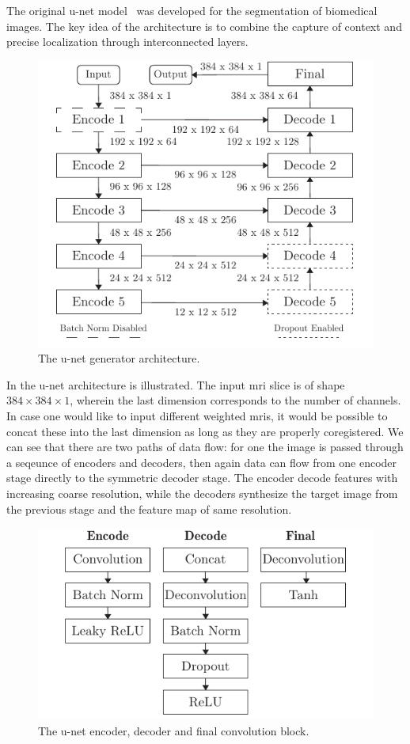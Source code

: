 The original u-net model~\cite{Ronneberger15} was developed for the
segmentation of biomedical images. The key idea of the architecture is to
combine the capture of context and precise localization through interconnected
layers.
\begin{figure}[h]
  \centering
  \includegraphics[width=\linewidth]{figure/unet-gen.pdf}
  \caption{The u-net generator architecture.
  }\label{fig:unet:gen}
\end{figure}
In  the u-net architecture is illustrated. The
input \gls{mri} slice is of shape $384\times384\times1$, wherein the last
dimension corresponds to the number of channels. In case one would like to
input different weighted \gls{mri}s, it would be possible to concat these into
the last dimension as long as they are properly coregistered.
We can see that there are two paths of data flow: for one the image is passed
through a seqeunce of encoders and decoders, then again data can flow from
one encoder stage directly to the symmetric decoder stage. The encoder decode
features with increasing coarse resolution, while the decoders synthesize the
target image from the previous stage and the feature map of same resolution.
\begin{figure}[h]
  \centering
  \includegraphics[width=\linewidth]{figure/unet-blocks.pdf}
  \caption{The u-net encoder, decoder and final convolution block.
	}\label{fig:unet:blocks}
\end{figure}
